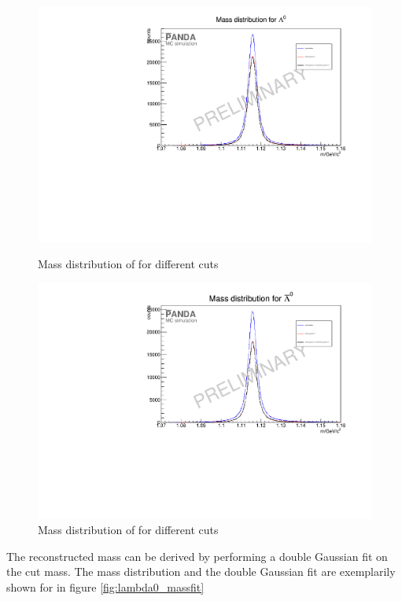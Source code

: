 		\begin{figure}
			\centering
				\includegraphics[width=1.1\textwidth]{./plots/lambda0/lambda0_m_diffcuts.pdf}
			\caption{\propose Mass distribution of \lam for different cuts}
			\label{fig:lambda0_massdiffcuts}
			
				\includegraphics[width=1.1\textwidth]{./plots/antilambda0/antiLambda0_m_diffcuts.pdf}
			\caption{\propose Mass distribution of \alam for different cuts}
			\label{fig:antilambda0_massdiffcuts}
		\end{figure}
		
		The reconstructed mass can be derived by performing a double Gaussian fit on the cut mass.
		The mass distribution and the double Gaussian fit are exemplarily shown for \lam in figure \ref{fig:lambda0_massfit}
		
